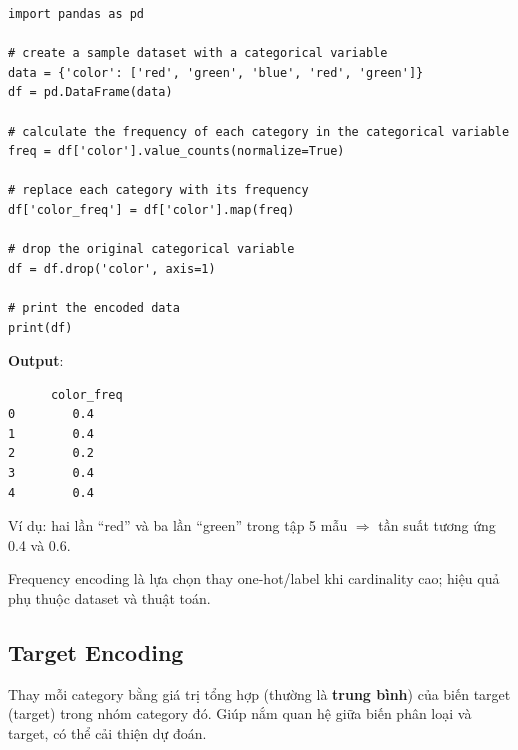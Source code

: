 \begin{vidu}[title={Ví dụ Frequency Encoding}]
\begin{lstlisting}
import pandas as pd

# create a sample dataset with a categorical variable
data = {'color': ['red', 'green', 'blue', 'red', 'green']}
df = pd.DataFrame(data)

# calculate the frequency of each category in the categorical variable
freq = df['color'].value_counts(normalize=True)

# replace each category with its frequency
df['color_freq'] = df['color'].map(freq)

# drop the original categorical variable
df = df.drop('color', axis=1)

# print the encoded data
print(df)
\end{lstlisting}

\textbf{Output}:
\begin{lstlisting}
      color_freq
0        0.4
1        0.4
2        0.2
3        0.4
4        0.4
\end{lstlisting}
Ví dụ: hai lần ``red'' và ba lần ``green'' trong tập 5 mẫu $\Rightarrow$ tần suất tương ứng 0.4 và 0.6.
\end{vidu}

\begin{luuy}[title={Ghi chú}]
Frequency encoding là lựa chọn thay one-hot/label khi cardinality cao; hiệu quả phụ thuộc dataset và thuật toán.
\end{luuy}

\subsection{Target Encoding}

\begin{dinhnghia}[title={Target encoding}]
Thay mỗi category bằng giá trị tổng hợp (thường là \textbf{trung bình}) của biến target (target) trong nhóm category đó.
Giúp nắm quan hệ giữa biến phân loại và target, có thể cải thiện dự đoán.
\end{dinhnghia}

